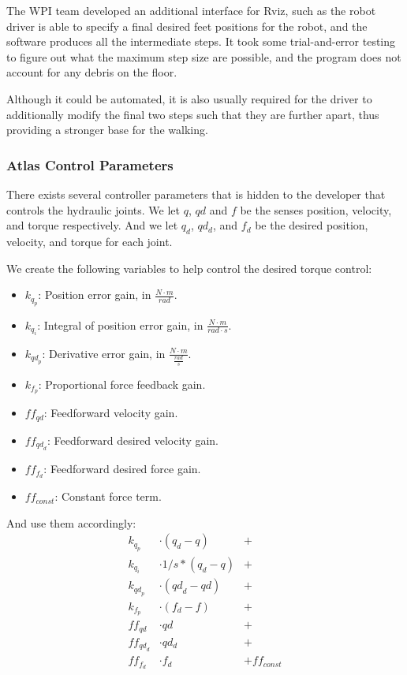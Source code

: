 \documentclass{article}
\begin{document}
The WPI team developed an additional interface for Rviz, such as the robot driver is able to specify a final desired feet positions for the robot, and the software produces all the intermediate steps. It took some trial-and-error testing to figure out what the maximum step size are possible, and the program does not account for any debris on the floor. 

Although it could be automated, it is also usually required for the driver to additionally modify the final two steps such that they are further apart, thus providing a stronger base for the walking. 

\subsubsection{Atlas Control Parameters}
There exists several controller parameters that is hidden to the developer that controls the hydraulic joints. We let $q$, $qd$ and $f$ be the senses position, velocity, and torque respectively. And we let $q_d$, $qd_d$, and $f_d$ be the desired position, velocity, and torque for each joint.

We create the following variables to help control the desired torque control:

\begin{itemize}
\item $k_{q_p}$: Position error gain, in $\frac{N \cdot m}{rad}$.
\item $k_{q_i} $: Integral of position error gain, in $\frac{N \cdot m}{rad \cdot s}$.
\item $k_{{qd}_p}$: Derivative error gain, in $\frac{N \cdot m}{\frac{rad}{s}}$.
\item $k_{f_p}$: Proportional force feedback gain.
\item ${ff}_{qd}$: Feedforward velocity gain.
\item ${ff}_{{qd}_d}$: Feedforward desired velocity gain.
\item ${ff}_{f_d}$: Feedforward desired force gain.
\item ${ff}_{const}$: Constant force term.
\end{itemize}

And use them accordingly: 
\begin{align*}
k_{q_p} &\cdot ( q_d - q ) &+\\
k_{q_i} &\cdot 1/s * ( q_d - q ) &+\\
k_{{qd}_p} &\cdot ( {qd}_d - qd ) &+\\
k_{f_p} &\cdot ( f_d - f ) &+\\
{ff}_{qd} &\cdot qd &+\\
{ff}_{{qd}_d} &\cdot qd_d &+\\
{ff}_{f_d} &\cdot f_d &+ {ff}_{const}
\end{align*}
\end{document}
